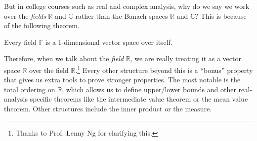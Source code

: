 \documentclass{article}
\begin{document}
  But in college courses such as real and complex analysis, why do we say we work over the \textit{fields} $\mathbb{R}$ and $\mathbb{C}$ rather than the Banach spaces $\mathbb{R}$ and $\mathbb{C}$? This is because of the following theorem. 

  \begin{theorem}
    Every field $\mathbb{F}$ is a $1$-dimensional vector space over itself. 
  \end{theorem}

  Therefore, when we talk about the \textit{field} $\mathbb{R}$, we are really treating it as a vector space $\mathbb{R}$ over the field $\mathbb{R}$.\footnote{Thanks to Prof. Lenny Ng for clarifying this.} Every other structure beyond this is a ``bonus'' property that gives us extra tools to prove stronger properties. The most notable is the total ordering on $\mathbb{R}$, which allows us to define upper/lower bounds and other real-analysis specific theorems like the intermediate value theorem or the mean value theorem. Other structures include the inner product or the measure. 
\end{document}
